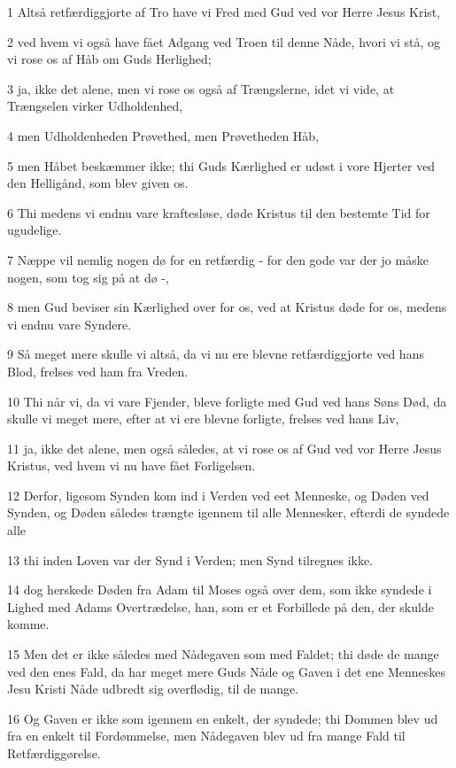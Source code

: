 \par 1 Altså retfærdiggjorte af Tro have vi Fred med Gud ved vor Herre Jesus Krist,
\par 2 ved hvem vi også have fået Adgang ved Troen til denne Nåde, hvori vi stå, og vi rose os af Håb om Guds Herlighed;
\par 3 ja, ikke det alene, men vi rose os også af Trængslerne, idet vi vide, at Trængselen virker Udholdenhed,
\par 4 men Udholdenheden Prøvethed, men Prøvetheden Håb,
\par 5 men Håbet beskæmmer ikke; thi Guds Kærlighed er udøst i vore Hjerter ved den Helligånd, som blev given os.
\par 6 Thi medens vi endnu vare kraftesløse, døde Kristus til den bestemte Tid for ugudelige.
\par 7 Næppe vil nemlig nogen dø for en retfærdig - for den gode var der jo måske nogen, som tog sig på at dø -,
\par 8 men Gud beviser sin Kærlighed over for os, ved at Kristus døde for os, medens vi endnu vare Syndere.
\par 9 Så meget mere skulle vi altså, da vi nu ere blevne retfærdiggjorte ved hans Blod, frelses ved ham fra Vreden.
\par 10 Thi når vi, da vi vare Fjender, bleve forligte med Gud ved hans Søns Død, da skulle vi meget mere, efter at vi ere blevne forligte, frelses ved hans Liv,
\par 11 ja, ikke det alene, men også således, at vi rose os af Gud ved vor Herre Jesus Kristus, ved hvem vi nu have fået Forligelsen.
\par 12 Derfor, ligesom Synden kom ind i Verden ved eet Menneske, og Døden ved Synden, og Døden således trængte igennem til alle Mennesker, efterdi de syndede alle
\par 13 thi inden Loven var der Synd i Verden; men Synd tilregnes ikke.
\par 14 dog herskede Døden fra Adam til Moses også over dem, som ikke syndede i Lighed med Adams Overtrædelse, han, som er et Forbillede på den, der skulde komme.
\par 15 Men det er ikke således med Nådegaven som med Faldet; thi døde de mange ved den enes Fald, da har meget mere Guds Nåde og Gaven i det ene Menneskes Jesu Kristi Nåde udbredt sig overflødig, til de mange.
\par 16 Og Gaven er ikke som igennem en enkelt, der syndede; thi Dommen blev ud fra en enkelt til Fordømmelse, men Nådegaven blev ud fra mange Fald til Retfærdiggørelse.
